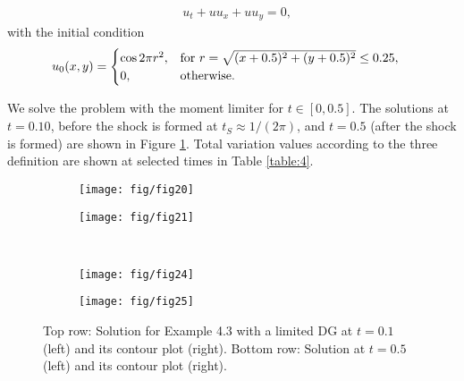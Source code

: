 \documentclass[reqno,a4paper,12pt]{amsart}
\begin{document}
\begin{align}
    &u_t + u u_x +u u_y = 0, \label{eq44a} 
    \end{align}
    with the initial condition
\begin{align}
    &u_0(x,y) = \begin{cases} \cos{2 \pi r^2}, & \mbox{for } r = \sqrt{(x+0.5)^2 + (y+0.5)^2}\leq 0.25, \\ 0,  & \mbox{otherwise. } \end{cases} \hfill
    \label{eq44b}
\end{align}

We solve the problem with the moment limiter for $t \in [0, 0.5]$. The solutions at $t=0.10$, before the shock is formed at $t_S \approx 1/(2\pi)$, and $t = 0.5$ (after the shock is formed) are shown in Figure \ref{fig:6}. Total variation values according to the three definition are shown at selected times in Table \ref{table:4}.

\begin{figure}[htb!]
\centering
     \begin{subfigure}[b]{0.45\textwidth}
         \centering
         \texttt{[image: fig/fig20]}
     \end{subfigure} \quad
     \begin{subfigure}[b]{0.45\textwidth}
         \centering
         \texttt{[image: fig/fig21]}
     \end{subfigure}
     \hfill\\ \vspace{1em}
     \begin{subfigure}[b]{0.45\textwidth}
         \centering
         \texttt{[image: fig/fig24]}
     \end{subfigure} \quad
     \begin{subfigure}[b]{0.45\textwidth}
         \centering
         \texttt{[image: fig/fig25]}
     \end{subfigure}
     \hfill
        \caption{Top row: Solution for Example 4.3 with a limited DG at $t = 0.1$ (left) and its contour plot (right). Bottom row: Solution at $t =0.5$ (left) and its contour plot (right).}
        \label{fig:6}
\end{figure}
\end{document}
